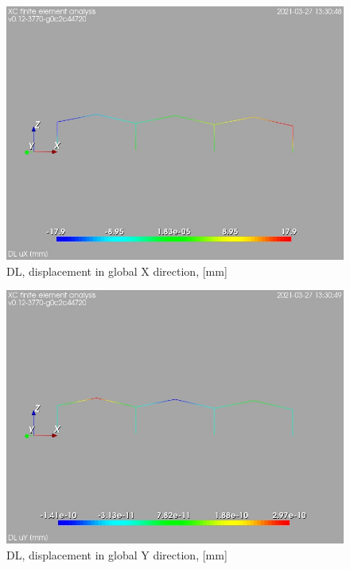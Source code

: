 \begin{figure}
\begin{center}
\includegraphics[width=\linewidth]{calc_results/sole_zeinali/text/graphics/resSimplLC/DLtotaluX}
\caption{DL, displacement in global X direction, [mm]}
\end{center}
\end{figure}
\begin{figure}
\begin{center}
\includegraphics[width=\linewidth]{calc_results/sole_zeinali/text/graphics/resSimplLC/DLtotaluY}
\caption{DL, displacement in global Y direction, [mm]}
\end{center}
\end{figure}
